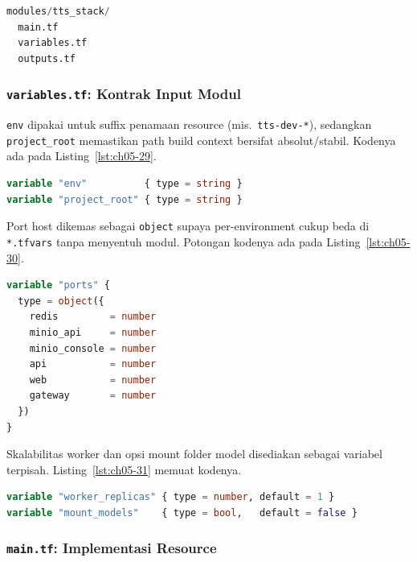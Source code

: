 \begin{lstlisting}[language=terraform, caption={Potongan kode Terraform pada Struktur Modul}, label={lst:ch05-28}]
modules/tts_stack/
  main.tf
  variables.tf
  outputs.tf
\end{lstlisting}

\subsubsection{\texttt{variables.tf}: Kontrak Input Modul}

\texttt{env} dipakai untuk suffix penamaan resource (mis.\ \texttt{tts-dev-*}), sedangkan \texttt{project\_root} memastikan path build context bersifat absolut/stabil. Kodenya ada pada Listing~\ref{lst:ch05-29}.

\begin{lstlisting}[language=terraform, caption={Potongan kode Terraform pada variables.tf}, label={lst:ch05-29}]
variable "env"          { type = string }
variable "project_root" { type = string }
\end{lstlisting}

Port host dikemas sebagai \texttt{object} supaya per-environment cukup beda di \texttt{*.tfvars} tanpa menyentuh modul. Potongan kodenya ada pada Listing~\ref{lst:ch05-30}.

\begin{lstlisting}[language=terraform, caption={Potongan kode Terraform pada variables.tf (2)}, label={lst:ch05-30}]
variable "ports" {
  type = object({
    redis         = number
    minio_api     = number
    minio_console = number
    api           = number
    web           = number
    gateway       = number
  })
}
\end{lstlisting}

Skalabilitas worker dan opsi mount folder model disediakan sebagai variabel terpisah. Listing~\ref{lst:ch05-31} memuat kodenya.

\begin{lstlisting}[language=terraform, caption={Potongan kode Terraform pada variables.tf (3)}, label={lst:ch05-31}]
variable "worker_replicas" { type = number, default = 1 }
variable "mount_models"    { type = bool,   default = false }
\end{lstlisting}

\subsubsection{\texttt{main.tf}: Implementasi Resource}

